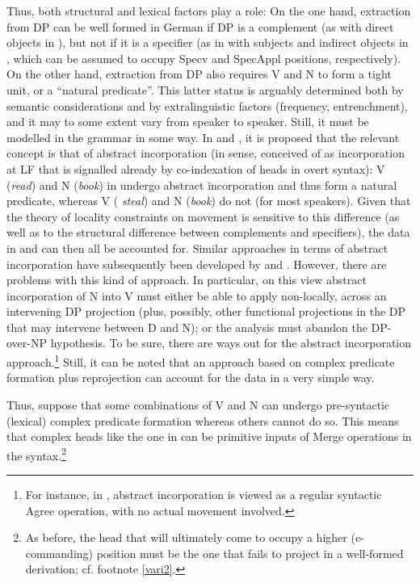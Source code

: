 \documentclass[output=paper
,modfonts
,nonflat]{langsci/langscibook}
\begin{document}
Thus, both structural and lexical factors play a role: On the one
hand, extraction from DP can be well formed in German if DP is a complement
(as with direct objects in \Last[ab]), but not if it is a specifier (as in
with subjects and indirect objects in \LLast[ab], which can be assumed
to occupy Specv and SpecAppl positions, respectively). On the other
hand, extraction from DP also requires V and N to form a tight unit,
or a ``natural predicate''. This latter status is arguably determined
both by semantic considerations and by extralinguistic factors
(frequency, entrenchment), and it may to some extent vary from speaker
to speaker. Still, it must be modelled in the grammar in some way. In
\cite{Mueller:91:abs} and \cite{Mueller&Sternefeld:95}, it is proposed
that the relevant concept is that of abstract incorporation (in
 sense, conceived of as incorporation at LF that
is signalled already by co-indexation of heads in overt syntax): V
({\it read}) and N ({\it book}) in \Last[a] undergo abstract
incorporation and thus form a natural predicate, whereas V ({\it
  steal}) and N ({\it book}) do not (for most speakers). Given that
the theory of locality constraints on movement is sensitive to this
difference (as well as to the structural difference between
complements and specifiers), the data in \LLast and \Last can then all
be accounted for. Similar approaches in terms of abstract
incorporation have subsequently been developed by
\cite{Davies&Dubinsky:03} and \cite{Schmellentin:06}. However, there
are problems with this kind of approach. In particular, on this view
abstract incorporation of N into V must either be able to apply
non-locally, across an intervening DP projection (plus, possibly,
other functional projections in the DP that may intervene between D
and N); or the analysis must abandon the DP-over-NP hypothesis. To be
sure, there are ways out for the abstract incorporation
approach.\footnote{For instance, in \cite{Mueller:11:loc}, abstract incorporation is
  viewed as a regular syntactic Agree operation, with no actual
  movement involved.} Still, it can be noted that an approach based on
complex predicate formation plus reprojection can account for the data
in a very simple way. 

Thus, suppose that some combinations of V and N can undergo
pre-syntactic (lexical) complex predicate formation whereas others
cannot do so. This means that complex heads like the one in \Next can
be primitive inputs of Merge operations in the syntax.\footnote{As
  before, the head that will ultimately come to occupy a higher
  (c-commanding) position must be the one that fails to project in a
  well-formed derivation; cf. footnote \ref{vari2}.}
\end{document}
